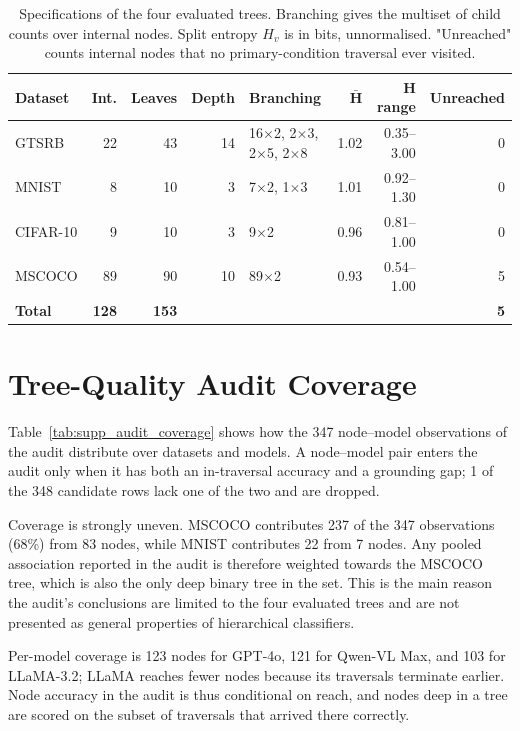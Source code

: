 \documentclass[10pt,twocolumn,letterpaper]{article}
\begin{document}
\begin{table}[t]
\centering
\caption{Specifications of the four evaluated trees. Branching gives the multiset of child counts over internal nodes. Split entropy $H_v$ is in bits, unnormalised. "Unreached" counts internal nodes that no primary-condition traversal ever visited.}
\label{tab:supp_tree_specs}
\footnotesize
\setlength{\tabcolsep}{4pt}
\begin{tabular}{@{}lrrrlrrr@{}}
\toprule
\textbf{Dataset} & \textbf{Int.} & \textbf{Leaves} & \textbf{Depth} & \textbf{Branching} & $\boldsymbol{\bar{H}}$ & $\boldsymbol{H}$ \textbf{range} & \textbf{Unreached} \\
\midrule
GTSRB     & 22 & 43 & 14 & 16$\times$2, 2$\times$3, 2$\times$5, 2$\times$8 & 1.02 & 0.35--3.00 & 0 \\
MNIST     & 8 & 10 & 3 & 7$\times$2, 1$\times$3 & 1.01 & 0.92--1.30 & 0 \\
CIFAR-10  & 9 & 10 & 3 & 9$\times$2 & 0.96 & 0.81--1.00 & 0 \\
MSCOCO    & 89 & 90 & 10 & 89$\times$2 & 0.93 & 0.54--1.00 & 5 \\
\midrule
\textbf{Total} & \textbf{128} & \textbf{153} & & & & & \textbf{5} \\
\bottomrule
\end{tabular}
\end{table}


\section{Tree-Quality Audit Coverage}
\label{sec:supp_audit}

Table~\ref{tab:supp_audit_coverage} shows how the 347 node--model
observations of the audit distribute over datasets and models. A node--model
pair enters the audit only when it has both an in-traversal accuracy and a
grounding gap; 1 of the 348 candidate rows lack one of the
two and are dropped.

Coverage is strongly uneven. MSCOCO contributes 237 of the
347 observations (68\%) from 83 nodes, while
MNIST contributes 22 from 7 nodes. Any pooled
association reported in the audit is therefore weighted towards the MSCOCO
tree, which is also the only deep binary tree in the set. This is the main
reason the audit's conclusions are limited to the four evaluated trees and are
not presented as general properties of hierarchical classifiers.

Per-model coverage is 123 nodes for GPT-4o, 121 for Qwen-VL
Max, and 103 for LLaMA-3.2; LLaMA reaches fewer nodes because its
traversals terminate earlier.
Node accuracy in the audit is thus conditional on reach, and nodes deep in a
tree are scored on the subset of traversals that arrived there correctly.
\end{document}
